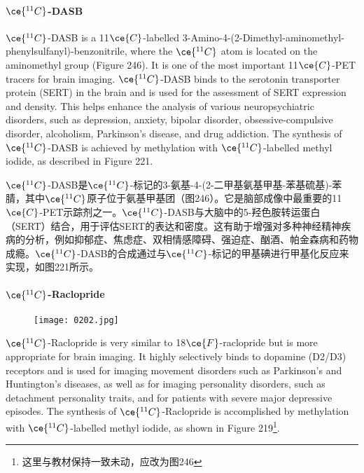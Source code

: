 \documentclass[dvipsnames, svgnames,a4paper,11pt]{article}
\begin{document}
\paragraph{\(\ce{^{11}C}\)-DASB}  
\(\ce{^{11}C}\)-DASB is a 11\(\ce{C}\)-labelled 3-Amino-4-(2-Dimethyl-aminomethyl-phenylsulfanyl)-benzonitrile, where the \(\ce{^{11}C}\) atom is located on the aminomethyl group (Figure 246). It is one of the most important 11\(\ce{C}\)-PET tracers for brain imaging. \(\ce{^{11}C}\)-DASB binds to the serotonin transporter protein (SERT) in the brain and is used for the assessment of SERT expression and density. This helps enhance the analysis of various neuropsychiatric disorders, such as depression, anxiety, bipolar disorder, obsessive-compulsive disorder, alcoholism, Parkinson's disease, and drug addiction. The synthesis of \(\ce{^{11}C}\)-DASB is achieved by methylation with \(\ce{^{11}C}\)-labelled methyl iodide, as described in Figure 221.

\(\ce{^{11}C}\)-DASB是\(\ce{^{11}C}\)-标记的3-氨基-4-(2-二甲基氨基甲基-苯基硫基)-苯腈，其中\(\ce{^{11}C}\)原子位于氨基甲基团（图246）。它是脑部成像中最重要的11\(\ce{C}\)-PET示踪剂之一。\(\ce{^{11}C}\)-DASB与大脑中的5-羟色胺转运蛋白（SERT）结合，用于评估SERT的表达和密度。这有助于增强对多种神经精神疾病的分析，例如抑郁症、焦虑症、双相情感障碍、强迫症、酗酒、帕金森病和药物成瘾。\(\ce{^{11}C}\)-DASB的合成通过与\(\ce{^{11}C}\)-标记的甲基碘进行甲基化反应来实现，如图221所示。

\paragraph{\(\ce{^{11}C}\)-Raclopride}  

\setcounter{figure}{245}


\begin{wrapfigure}{r}{0.4\textwidth}
    \centering
    \texttt{[image: 0202.jpg]}
     \label{fig246a}

\end{wrapfigure}

\(\ce{^{11}C}\)-Raclopride is very similar to 18\(\ce{F}\)-raclopride but is more appropriate for brain imaging. It highly selectively binds to dopamine (D2/D3) receptors and is used for imaging movement disorders such as Parkinson's and Huntington's diseases, as well as for imaging personality disorders, such as detachment personality traits, and for patients with severe major depressive episodes. The synthesis of \(\ce{^{11}C}\)-Raclopride is accomplished by methylation with \(\ce{^{11}C}\)-labelled methyl iodide, as shown in Figure 219\footnote{这里与教材保持一致未动，应改为图246}.
\end{document}
